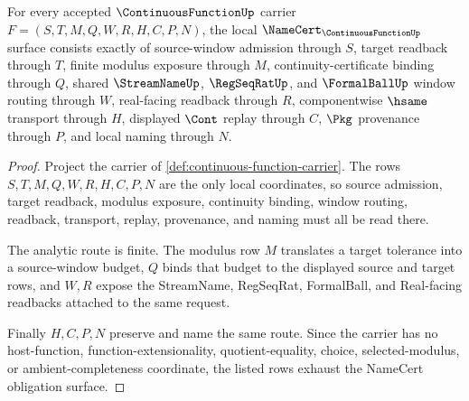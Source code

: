 \begin{theorem}
\label{thm:continuous-function-namecert-obligations}
For every accepted $\ContinuousFunctionUp$ carrier $F=(S,T,M,Q,W,R,H,C,P,N)$, the local $\NameCert_{\ContinuousFunctionUp}$ surface consists exactly of source-window admission through $S$, target readback through $T$, finite modulus exposure through $M$, continuity-certificate binding through $Q$, shared $\StreamNameUp$, $\RegSeqRatUp$, and $\FormalBallUp$ window routing through $W$, real-facing readback through $R$, componentwise $\hsame$ transport through $H$, displayed $\Cont$ replay through $C$, $\Pkg$ provenance through $P$, and local naming through $N$.
\end{theorem}
\begin{proof}
Project the carrier of \autoref{def:continuous-function-carrier}. The rows $S,T,M,Q,W,R,H,C,P,N$ are the only local coordinates, so source admission, target readback, modulus exposure, continuity binding, window routing, readback, transport, replay, provenance, and naming must all be read there.

The analytic route is finite. The modulus row $M$ translates a target tolerance into a source-window budget, $Q$ binds that budget to the displayed source and target rows, and $W,R$ expose the StreamName, RegSeqRat, FormalBall, and Real-facing readbacks attached to the same request.

Finally $H,C,P,N$ preserve and name the same route. Since the carrier has no host-function, function-extensionality, quotient-equality, choice, selected-modulus, or ambient-completeness coordinate, the listed rows exhaust the NameCert obligation surface.
\end{proof}

